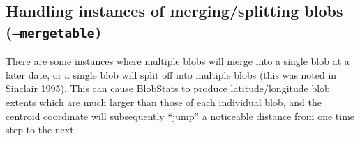 \documentclass{article}
\begin{document}
%
%
%
%

\subsection{Handling instances of merging/splitting blobs (\texttt{--mergetable)}}\label{mergesection}
There are some instances where multiple blobs will merge into a single blob at a later date, or a single blob will split off into multiple blobs (this was noted in Sinclair 1995). This can cause BlobStats to produce latitude/longitude blob extents which are much larger than those of each individual blob, and the centroid coordinate will subsequently ``jump'' a noticeable distance from one time step to the next. 
\end{document}
